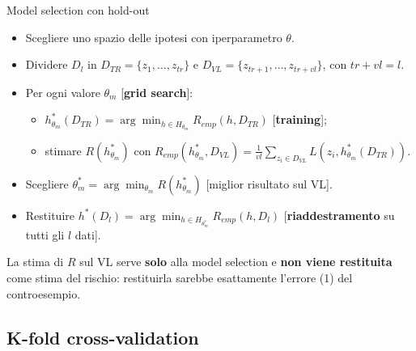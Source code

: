 \begin{boxabstract}{Model selection con hold-out}

\begin{itemize}
\tightlist
\item
  Scegliere uno spazio delle ipotesi con iperparametro \(\theta\).
\item
  Dividere \(D_l\) in \(D_{TR} = \{z_1, \dots, z_{tr}\}\) e
  \(D_{VL} = \{z_{tr+1}, \dots, z_{tr+vl}\}\), con \(tr + vl = l\).
\item
  Per ogni valore \(\theta_m\) {[}\textbf{grid search}{]}:

  \begin{itemize}
  \tightlist
  \item
    \(h^*_{\theta_m}(D_{TR}) = \arg\min_{h \in H_{\theta_m}} R_{emp}(h, D_{TR})\)
    {[}\textbf{training}{]};
  \item
    stimare \(R(h^*_{\theta_m})\) con
    \(R_{emp}(h^*_{\theta_m}, D_{VL}) = \frac{1}{vl}\sum_{z_i \in D_{VL}} L(z_i, h^*_{\theta_m}(D_{TR}))\).
  \end{itemize}
\item
  Scegliere \(\theta^*_m = \arg\min_{\theta_m} R(h^*_{\theta_m})\)
  {[}miglior risultato sul VL{]}.
\item
  Restituire
  \(h^*(D_l) = \arg\min_{h \in H_{\theta^*_m}} R_{emp}(h, D_l)\)
  {[}\textbf{riaddestramento} su tutti gli \(l\) dati{]}.
\end{itemize}

\end{boxabstract}

La stima di \(R\) sul VL serve \textbf{solo} alla model selection e
\textbf{non viene restituita} come stima del rischio: restituirla
sarebbe esattamente l'errore (1) del controesempio.

\subsection{K-fold cross-validation}\label{k-fold-cross-validation}

